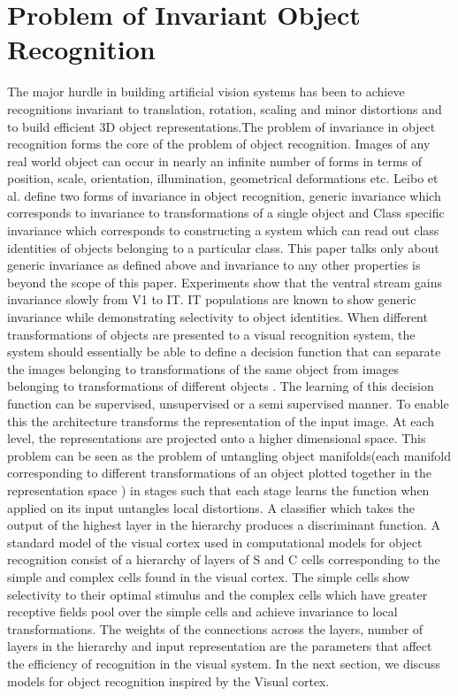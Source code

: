 \documentclass[12pt,twoside]{article}
\theoremstyle{plain}
\theoremstyle{definition}
\theoremstyle{remark}
\begin{document}
\section{Problem of Invariant Object Recognition}
\label{sec:objectrecognition}
The major hurdle in building artificial vision systems has been to achieve recognitions invariant to translation, rotation, scaling and minor distortions and to build efficient 3D object representations.The problem of invariance in object recognition forms the core of the problem of object recognition\cite{JamesJ.DiCarlo2007}. Images of any real world object can occur in nearly an infinite number of forms in terms of position, scale, orientation, illumination, geometrical deformations etc\cite{NicolasPinto2008}. Leibo et al.\cite{rohtua} define two forms of invariance in object recognition, generic invariance which corresponds to invariance to transformations of a single object and Class specific invariance which corresponds to constructing a system which can read out class identities of objects belonging to a particular class. This paper talks only about generic invariance as defined above\cite{rohtua} and invariance to any other properties is beyond the scope of this paper. Experiments show that the ventral stream gains invariance slowly from V1 to IT. IT populations are known to show generic invariance while demonstrating selectivity to object identities\cite{HungCP2005}. When different transformations of objects are presented to a visual recognition system, the system should essentially be able to define a decision function that can separate the images belonging to transformations of the same object from images belonging to transformations of different objects\cite{AshbyFG1988} . The learning of this decision function can be supervised, unsupervised or a semi supervised manner. To enable this the architecture transforms the representation of the input image. At each level, the representations are projected onto a higher dimensional space\cite{JamesJ.DiCarlo2007}. This problem can be seen as the problem of untangling object manifolds\cite{JamesJ.DiCarlo2007}(each manifold corresponding to different transformations of an object plotted together in the representation space \cite{Edelm1999}) in stages such that each stage learns the function when applied on its input untangles local distortions. A classifier which takes the output of the highest layer in the hierarchy produces a discriminant function. A standard model of the visual cortex used in computational models for object recognition consist of a hierarchy of layers of S and C cells corresponding to the simple and complex cells\cite{D.H.Hubel1977} found in the visual cortex. The simple cells show selectivity to their optimal stimulus and the complex cells which have greater receptive fields pool over the simple cells and achieve invariance to local transformations. The weights of the connections across the layers, number of layers in the hierarchy and input representation are the parameters that affect the efficiency of recognition in the visual system. In the next section, we discuss models for object recognition inspired by the Visual cortex.
\end{document}
